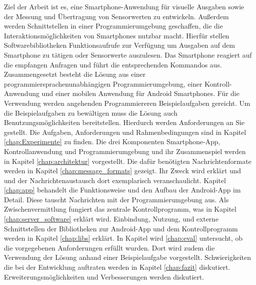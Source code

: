 \documentclass[11pt,a4paper]{report}
\begin{document}
Ziel der Arbeit ist es, eine Smartphone-Anwendung für visuelle Ausgaben sowie der Messung und Übertragung von Sensorwerten zu entwickeln.
Außerdem werden Schnittstellen in einer Programmierumgebung geschaffen, die die Interaktionsmöglichkeiten von Smartphones nutzbar macht.
Hierfür stellen Softwarebibliotheken Funktionsaufrufe zur Verfügung um Ausgaben auf dem Smartphone zu tätigen oder Sensorwerte auszulesen.
Das Smartphone reagiert auf die empfangen Anfragen und führt die entsprechenden Kommandos aus.
Zusammengesetzt besteht die Lösung aus einer programmiersprachenunabhängigen Programmierumgebung, einer Kontroll-Anwendung und einer mobilen Anwendung für Android Smartphones.
Für die Verwendung werden angehenden Programmiereren Beispielaufgaben gereicht.
Um die Beispielaufgaben zu bewältigen muss die Lösung auch Benutzungsmöglichkeiten bereitstellen.
Hierdurch werden Anforderungen an Sie gestellt.
Die Aufgaben, Anforderungen und Rahmenbedingungen sind in Kapitel \ref{chap:Experimente} zu finden.
Die drei Komponenten Smartphone-App, Kontrollanwendung und Programmierumgebung und ihr Zusammenspiel werden
in Kapitel \ref{chap:architektur} vorgestellt.
Die dafür benötigten Nachrichtenformate werden in Kapitel \ref{chap:message_formats} gezeigt.
Ihr Zweck wird erklärt und und der Nachrichtenaustausch dort exemplarisch veranschaulicht.
Kapitel \ref{chap:app} behandelt die Funktionsweise und den Aufbau der Android-App im Detail.
Diese tauscht Nachrichten mit der Programmierumgebung aus.
Als Zwischenvermittlung fungiert das zentrale Kontrollprogramm, was in Kapitel \ref{chap:server_software} erklärt wird.
Einbindung, Nutzung, und externe Schnittstellen der Bibliotheken zur Android-App und dem Kontrollprogramm werden in Kapitel \ref{chap:libs} erklärt.
In Kapitel wird \ref{chap:eval} untersucht, ob die vorgegebenen Anforderungen erfüllt wurden.
Dort wird zudem die Verwendung der Lösung anhand einer Beispielaufgabe vorgestellt.
Schwierigkeiten die bei der Entwicklung auftraten werden in Kapitel \ref{chap:fazit} diskutiert.
Erweiterungsmöglichkeiten und Verbesserungen werden diskutiert.
\end{document}
